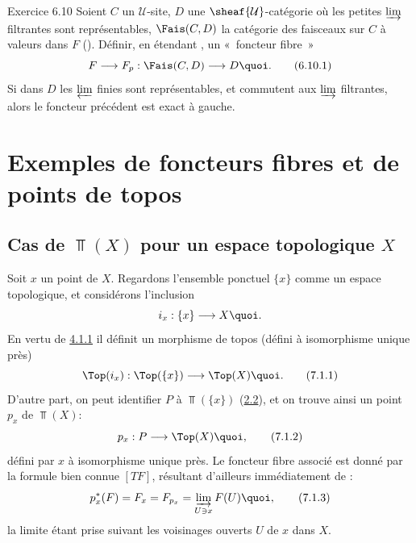 \documentclass[10pt]{../fichiers-configuration-latex/smfart}
\begin{document}
\begin{enonce*}[remark]{Exercice 6.10}
Soient $C$ un $\mathcal{U}$-site, $D$ une
$\sheaf{\mathcal{U}}$-catégorie où les petites $\varinjlim$
filtrantes sont représentables, $\Fais(C,D)$ la catégorie des
faisceaux sur $C$ à valeurs dans $F$ (). Définir, en
étendant , un « foncteur fibre »
\begin{equation*}
F\longrightarrow F_p:\Fais(C,D)\longrightarrow D{\quoi}.\tag{6.10.1}
\end{equation*}
Si dans $D$ les $\varprojlim$ finies sont représentables, et
commutent aux $\varinjlim$ filtrantes, alors le foncteur précédent
est exact à gauche.
\end{enonce*}

\section{Exemples de foncteurs fibres et de points de topos}\pageoriginale

\subsection{Cas de $\Top(X)$ pour un espace topologique
  $X$}

Soit $x$ un point de $X$. Regardons l'ensemble ponctuel $\{x\}$
comme un espace topologique, et considérons l'inclusion
$$
i_x:\{x\}\longrightarrow X{\quoi}.
$$
En vertu de \hyperref[IV.subsubsec4.1.1]{4.1.1} il définit un morphisme de topos
(défini à isomorphisme unique près)
\begin{equation*}
\Top(i_x):\Top(\{x\})\longrightarrow \Top(X){\quoi}.\tag{7.1.1}
\end{equation*}
D'autre part, on peut identifier $P$ à $\Top(\{x\})$
(\hyperref[IV.subsec2.2]{2.2}), et on trouve ainsi un point $p_x$ de
$\Top(X)$:
\begin{equation*}
p_x:P\longrightarrow \Top(X){\quoi},\tag{7.1.2}
\end{equation*}
défini par $x$ à isomorphisme unique près. Le foncteur fibre associé
est donné par la formule bien connue $[TF]$, résultant d'ailleurs
immédiatement de :
\begin{equation*}
p^{\ast}_x(F)=F_x=F_{p_x}=\varinjlim_{U\ni x}F(U){\quoi},\tag{7.1.3}
\end{equation*}
la limite étant prise suivant les voisinages ouverts $U$ de $x$ dans
$X$.
\end{document}
